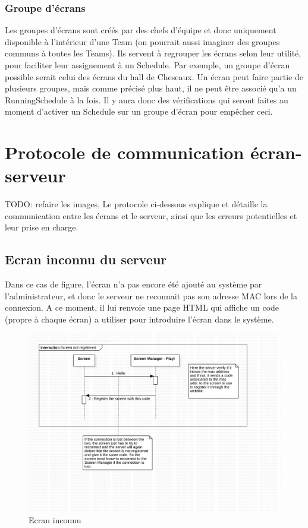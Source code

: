 \documentclass[french]{article}
\begin{document}
\subsubsection{Groupe d'écrans}
Les groupes d'écrans sont créés par des chefs d'équipe et donc uniquement disponible à l'intérieur d'une Team (on pourrait aussi imaginer des groupes communs à toutes les Teams). Ils servent à regrouper les écrans selon leur utilité, pour faciliter leur assignement à un Schedule. Par exemple, un groupe d'écran possible serait celui des écrans du hall de Cheseaux. \newline
Un écran peut faire partie de plusieurs groupes, mais comme précisé plus haut, il ne peut être associé qu'a un RunningSchedule à la fois. Il y aura donc des vérifications qui seront faites au moment d'activer un Schedule sur un groupe d'écran pour empêcher ceci.

\newpage

		
\section{Protocole de communication écran-serveur}
TODO: refaire les images.\newline
	Le protocole ci-dessous explique et détaille la communication entre les écrans et le serveur, ainsi que les erreurs potentielles et leur prise en charge. 
	
\subsection{Ecran inconnu du serveur}
	Dans ce cas de figure, l'écran n'a pas encore été ajouté au système par l'administrateur, et donc le serveur ne reconnait pas son adresse MAC lors de la connexion. A ce moment, il lui renvoie une page HTML qui affiche un code (propre à chaque écran) a utiliser pour introduire l'écran dans le système.
	
		\begin{figure}[hbt!]
			\centering
			\includegraphics[page={1}, scale=0.5]{protocol_v2}
			\caption{Ecran inconnu}
		\end{figure}
	
\end{document}
